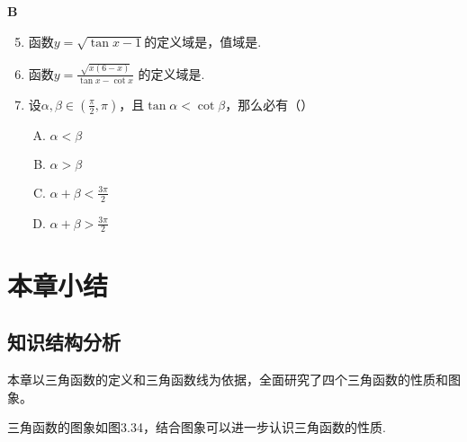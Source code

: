 \begin{center}
    \bfseries B
\end{center}
\begin{enumerate}\setcounter{enumi}{4}
    \item 函数$y=\sqrt{\tan x-1}$的定义域是\blank，值域是\blank.
   
    \item   函数$y=\frac{\sqrt{x(6-x)}}{\tan x-\cot x}$ 的定义域是\blank.
    \item   设$\alpha,\beta\in \left(\frac{\pi}{2},\pi\right)$，且$\tan\alpha<\cot\beta$，那么必有（\qquad ）
\begin{multicols}{2}
\begin{enumerate}[(A)]
    \item $\alpha<\beta$
    \item $\alpha>\beta$
    \item $\alpha+\beta<\frac{3\pi}{2}$
    \item $\alpha+\beta>\frac{3\pi}{2}$
\end{enumerate}
\end{multicols}
\end{enumerate}


\section{本章小结}

\subsection{知识结构分析}
本章以三角函数的定义和三角函数线为依据，全面研究了四个三角函数的性质和图象。

三角函数的图象如图3.34，结合图象可以进一步认识三角函数的性质.


